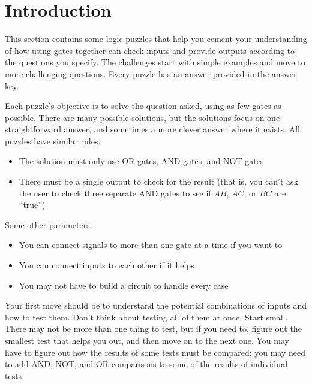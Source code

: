 

\section*{Introduction}

This section contains some logic puzzles that help you cement your understanding of how using gates together can check inputs and provide outputs according to the questions you specify. The challenges start with simple examples and move to more challenging questions. Every puzzle has an answer provided in the answer key.

Each puzzle's objective is to solve the question asked, using as few gates as possible. There are many possible solutions, but the solutions focus on one straightforward answer, and sometimes a more clever answer where it exists. All puzzles have similar rules.

\begin{itemize}
\item The solution must only use OR gates, AND gates, and NOT gates
\item There must be a single output to check for the result (that is, you can't ask the user to check three separate AND gates to see if $AB$, $AC$, or $BC$ are ``true'')
\end{itemize}

Some other parameters:
\begin{itemize}
\item You can connect signals to more than one gate at a time if you want to
\item You can connect inputs to each other if it helps
\item You may not have to build a circuit to handle every case
\end{itemize}

Your first move should be to understand the potential combinations of inputs and how to test them. Don't think about testing all of them at once. Start small. There may not be more than one thing to test, but if you need to, figure out the smallest test that helps you out, and then move on to the next one. You may have to figure out how the results of some tests must be compared: you may need to add AND, NOT, and OR comparisons to some of the results of individual tests.

